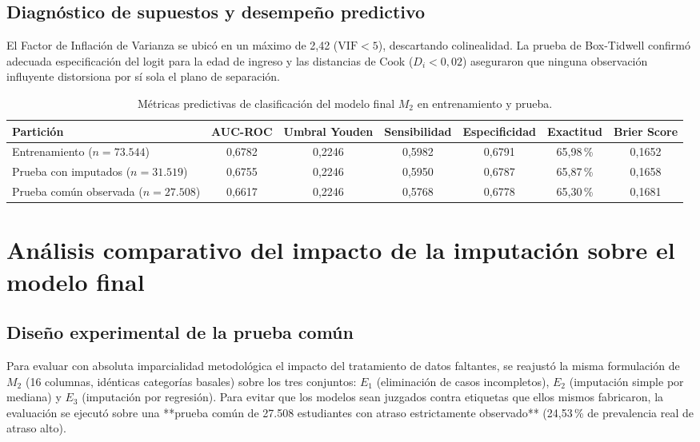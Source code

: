 \documentclass[11pt,a4paper]{article}
\begin{document}
\subsection{Diagnóstico de supuestos y desempeño predictivo}
El Factor de Inflación de Varianza se ubicó en un máximo de 2,42 ($\text{VIF} < 5$), descartando colinealidad. La prueba de Box-Tidwell confirmó adecuada especificación del logit para la edad de ingreso y las distancias de Cook ($D_i < 0,02$) aseguraron que ninguna observación influyente distorsiona por sí sola el plano de separación.

\begin{table}[h!]
\centering
\small
\caption{Métricas predictivas de clasificación del modelo final $M_2$ en entrenamiento y prueba.}
\begin{tabular}{lcccccc}
\toprule
\textbf{Partición} & \textbf{AUC-ROC} & \textbf{Umbral Youden} & \textbf{Sensibilidad} & \textbf{Especificidad} & \textbf{Exactitud} & \textbf{Brier Score} \\
\midrule
Entrenamiento ($n=73.544$) & 0,6782 & 0,2246 & 0,5982 & 0,6791 & 65,98\,\% & 0,1652 \\
Prueba con imputados ($n=31.519$) & 0,6755 & 0,2246 & 0,5950 & 0,6787 & 65,87\,\% & 0,1658 \\
Prueba común observada ($n=27.508$) & 0,6617 & 0,2246 & 0,5768 & 0,6778 & 65,30\,\% & 0,1681 \\
\bottomrule
\end{tabular}
\end{table}

\newpage

\section{Análisis comparativo del impacto de la imputación sobre el modelo final}

\subsection{Diseño experimental de la prueba común}
Para evaluar con absoluta imparcialidad metodológica el impacto del tratamiento de datos faltantes, se reajustó la misma formulación de $M_2$ (16 columnas, idénticas categorías basales) sobre los tres conjuntos: $E_1$ (eliminación de casos incompletos), $E_2$ (imputación simple por mediana) y $E_3$ (imputación por regresión). Para evitar que los modelos sean juzgados contra etiquetas que ellos mismos fabricaron, la evaluación se ejecutó sobre una **prueba común de 27.508 estudiantes con atraso estrictamente observado** (24,53\,\% de prevalencia real de atraso alto).
\end{document}
